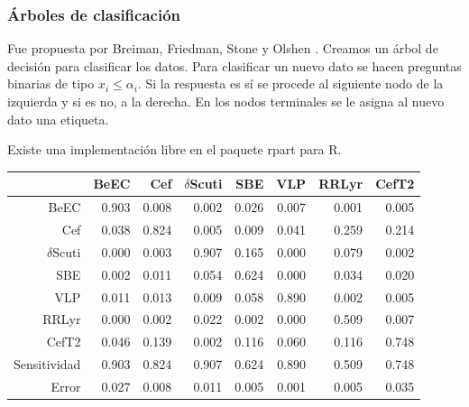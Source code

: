\documentclass{beamer}
\begin{document}
\begin{frame}
  \frametitle{Árboles de clasificación}
  Fue propuesta por Breiman, Friedman, Stone y Olshen \cite{breiman_classification_1984}. Creamos un árbol de decisión para clasificar los datos. Para clasificar un nuevo dato se hacen preguntas binarias de tipo $x_i\leq \alpha_i$. Si la respuesta es sí se procede al siguiente nodo de la izquierda y si es no,  a la derecha. En los nodos terminales se le asigna al nuevo dato una etiqueta. 
  
  Existe una implementación libre en el paquete rpart para R.


  \begin{table}[ht]
    \centering
    \resizebox{0.7\textwidth}{!} {
      \begin{tabular}{rrrrrrrr}
        \hline
        & BeEC & Cef & $\delta$Scuti & SBE & VLP & RRLyr & CefT2 \\ 
        \hline
        BeEC & 0.903 & 0.008 & 0.002 & 0.026 & 0.007 & 0.001 & 0.005 \\ 
        Cef & 0.038 & 0.824 & 0.005 & 0.009 & 0.041 & 0.259 & 0.214 \\ 
        $\delta$Scuti & 0.000 & 0.003 & 0.907 & 0.165 & 0.000 & 0.079 & 0.002 \\ 
        SBE & 0.002 & 0.011 & 0.054 & 0.624 & 0.000 & 0.034 & 0.020 \\ 
        VLP & 0.011 & 0.013 & 0.009 & 0.058 & 0.890 & 0.002 & 0.005 \\ 
        RRLyr & 0.000 & 0.002 & 0.022 & 0.002 & 0.000 & 0.509 & 0.007 \\ 
        CefT2 & 0.046 & 0.139 & 0.002 & 0.116 & 0.060 & 0.116 & 0.748 \\ 
        \hline
        Sensitividad & 0.903 & 0.824 & 0.907 & 0.624 & 0.890 & 0.509 & 0.748 \\ 
        \hline
        Error & 0.027 & 0.008 & 0.011 & 0.005 & 0.001 & 0.005 & 0.035 \\ 
        \hline
      \end{tabular}
    }
  \end{table}
\end{frame}
\end{document}
